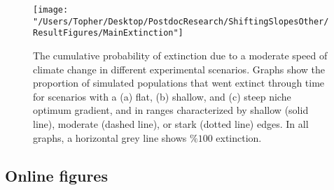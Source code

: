 \documentclass[11pt]{article}
\begin{document}
\clearpage

\begin{figure}[h!]
\texttt{[image: "/Users/Topher/Desktop/PostdocResearch/ShiftingSlopesOther/ResultFigures/MainExtinction"]}
\caption{The cumulative probability of extinction due to a moderate speed of climate change in different experimental scenarios. Graphs show the proportion of simulated populations that went extinct through time for scenarios with a (a) flat, (b) shallow, and (c) steep niche optimum gradient, and in ranges characterized by shallow (solid line), moderate (dashed line), or stark (dotted line) edges. In all graphs, a horizontal grey line shows $\%100$ extinction.}
\label{fig:ExtProb}
\end{figure}

\clearpage



\subsection*{Online figures}

\renewcommand{\thefigure}{A\arabic{figure}}
\setcounter{figure}{0}
\end{document}
